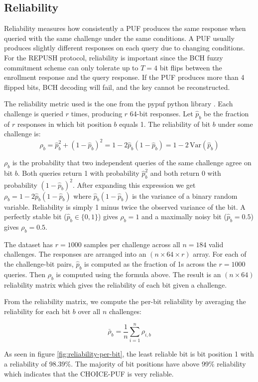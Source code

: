 \subsection{Reliability}
Reliability measures how consistently a PUF produces the same response when queried with the same challenge under the same conditions. A PUF usually produces slightly different responses on each query due to changing conditions. For the REPUSH protocol, reliability is important since the BCH fuzzy commitment scheme can only tolerate up to $T=4$ bit flips between the enrollment response and the query response. If the PUF produces more than 4 flipped bits, BCH decoding will fail, and the key cannot be reconstructed.

The reliability metric used is the one from the pypuf python library \cite{nils_wisiol_2021_5222515}. Each challenge is queried $r$ times, producing $r$ 64-bit responses. Let $\hat{p}_b$ be the fraction of $r$ responses in which bit position $b$ equals 1. The reliability of bit $b$ under some challenge is:
$$
\rho_b = \hat{p}_b^2 + (1-\hat{p}_b)^2 = 1 - 2\hat{p}_b(1-\hat{p}_b) = 1 - 2\,\mathrm{Var}(\hat{p}_b)
$$

$\rho_b$ is the probability that two independent queries of the same challenge agree on bit $b$. Both queries return 1 with probability $\hat{p}_b^2$ and both return 0 with probability $(1-\hat{p}_b)^2$. After expanding this expression we get $\rho_b = 1 - 2\hat{p}_b(1-\hat{p}_b)$ where $\hat{p}_b(1-\hat{p}_b)$ is the variance of a binary random variable. Reliability is simply 1 minus twice the observed variance of the bit. A perfectly stable bit ($\hat{p}_b \in \{0,1\}$) gives $\rho_b = 1$ and a maximally noisy bit ($\hat{p}_b = 0.5$) gives $\rho_b = 0.5$.

The dataset has $r=1000$ samples per challenge across all $n=184$ valid challenges. The responses are arranged into an $(n \times 64 \times r)$ array. For each of the challenge-bit pairs, $\hat{p}_b$ is computed as the fraction of 1s across the $r=1000$ queries. Then $\rho_b$ is computed using the formula above. The result is an $(n \times 64)$ reliability matrix which gives the reliability of each bit given a challenge.

From the reliability matrix, we compute the per-bit reliability by averaging the reliability for each bit $b$ over all $n$ challenges:

$$
\bar{\rho}_b = \frac{1}{n} \sum_{i=1}^{n} \rho_{i,b}
$$

As seen in figure \ref{fig:reliability-per-bit}, the least reliable bit is bit position 1 with a reliability of 98.39\%. The majority of bit positions have above 99\% reliability which indicates that the CHOICE-PUF is very reliable.

